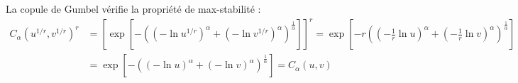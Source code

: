 \documentclass[11pt]{article}
\begin{document}
\begin{small}
La copule de Gumbel v\'erifie la propri\'et\'e de max-stabilit\'e :
\begin{align*}
C_\alpha\left(u^{1/r},v^{1/r}\right)^r &= \left[ \exp\left[-\left(\left(-\ln u^{1/r}\right)^\alpha + \left(-\ln v^{1/r}\right)^\alpha\right)^\frac{1}{\alpha}\right] \right]^r 
                                       = \exp\left[ -r\left(\left(-\frac{1}{r}\ln u\right)^\alpha + \left(-\frac{1}{r}\ln v\right)^\alpha\right)^\frac{1}{\alpha} \right] \\
                                      & = \exp\left[ -\left(\left(-\ln u\right)^\alpha + \left(-\ln v\right)^\alpha\right)^\frac{1}{\alpha} \right] = C_\alpha(u,v)
\end{align*}

\end{small}
\end{document}
